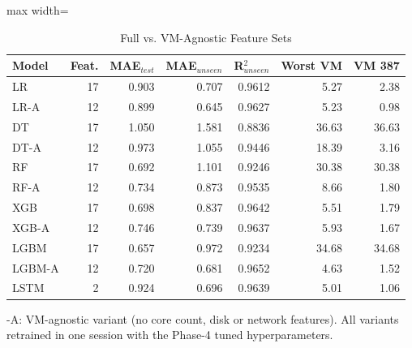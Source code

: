 \begin{table}[!htb]
\centering
\caption{Full vs. VM-Agnostic Feature Sets}
\label{tab:ablation}
\footnotesize
\setlength{\tabcolsep}{4pt}
\begin{adjustbox}{max width=\columnwidth}
\begin{tabular}{lrrrrrr}
\toprule
Model & Feat. & MAE$_{test}$ & MAE$_{unseen}$ & R$^2_{unseen}$ & Worst VM & VM 387 \\
\midrule
LR & 17 & 0.903 & 0.707 & 0.9612 & 5.27 & 2.38 \\
LR-A & 12 & 0.899 & 0.645 & 0.9627 & 5.23 & 0.98 \\
DT & 17 & 1.050 & 1.581 & 0.8836 & 36.63 & 36.63 \\
DT-A & 12 & 0.973 & 1.055 & 0.9446 & 18.39 & 3.16 \\
RF & 17 & 0.692 & 1.101 & 0.9246 & 30.38 & 30.38 \\
RF-A & 12 & 0.734 & 0.873 & 0.9535 & 8.66 & 1.80 \\
XGB & 17 & 0.698 & 0.837 & 0.9642 & 5.51 & 1.79 \\
XGB-A & 12 & 0.746 & 0.739 & 0.9637 & 5.93 & 1.67 \\
LGBM & 17 & 0.657 & 0.972 & 0.9234 & 34.68 & 34.68 \\
LGBM-A & 12 & 0.720 & 0.681 & 0.9652 & 4.63 & 1.52 \\
LSTM & 2 & 0.924 & 0.696 & 0.9639 & 5.01 & 1.06 \\
\bottomrule
\end{tabular}
\end{adjustbox}
\par\vspace{3pt}
{\scriptsize -A: VM-agnostic variant (no core count, disk or network features). All variants retrained in one session with the Phase-4 tuned hyperparameters.\par}
\end{table}

